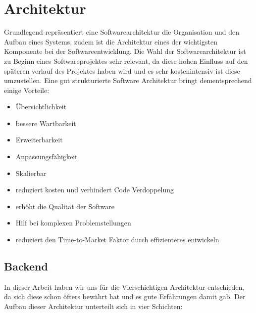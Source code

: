\documentclass[a4paper, fontsize=11pt, parskip=half, twoside]{scrreprt}
\begin{document}
	
	\section{Architektur}
	Grundlegend repräsentiert eine Softwarearchitektur die Organisation und den Aufbau eines Systems, zudem ist die Architektur eines der wichtigsten Komponente bei der Softwareentwicklung.
	Die Wahl der Softwarearchitektur ist zu Beginn eines Softwareprojektes sehr relevant, da diese hohen Einfluss auf den späteren verlauf des Projektes haben wird und es sehr kostenintensiv ist diese umzustellen.
	Eine gut strukturierte Software Architektur bringt dementsprechend einige Vorteile:
	
	\begin{itemize}
		\item Übersichtlichkeit
		\item bessere Wartbarkeit
		\item Erweiterbarkeit
		\item Anpassungsfähigkeit
		\item Skalierbar
		\item reduziert kosten und verhindert Code Verdoppelung
		\item erhöht die Qualität der Software
		\item Hilf bei komplexen Problemstellungen
		\item reduziert den Time-to-Market Faktor durch effizienteres entwickeln
	\end{itemize}
	
	\textcite{richards_fundamentals_2020}
	
	\subsection{Backend}
	In dieser Arbeit haben wir uns für die Vierschichtigen  Architektur entschieden, da sich diese schon öfters bewährt hat und es gute Erfahrungen damit gab.
	Der Aufbau dieser Architektur unterteilt sich in vier Schichten:
	
\end{document}
